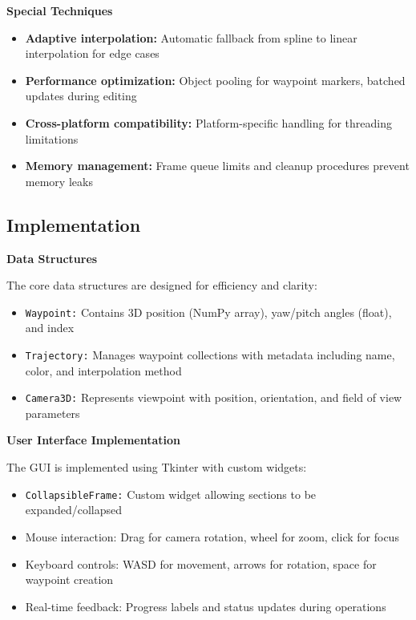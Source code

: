 \documentclass[11pt,a4paper]{article}
\begin{document}
\textbf{Special Techniques}

\begin{itemize}
\item \textbf{Adaptive interpolation:} Automatic fallback from spline to linear interpolation for edge cases
\item \textbf{Performance optimization:} Object pooling for waypoint markers, batched updates during editing
\item \textbf{Cross-platform compatibility:} Platform-specific handling for threading limitations
\item \textbf{Memory management:} Frame queue limits and cleanup procedures prevent memory leaks
\end{itemize}

\subsection{Implementation}

\textbf{Data Structures}

The core data structures are designed for efficiency and clarity:

\begin{itemize}
\item \texttt{Waypoint:} Contains 3D position (NumPy array), yaw/pitch angles (float), and index
\item \texttt{Trajectory:} Manages waypoint collections with metadata including name, color, and interpolation method
\item \texttt{Camera3D:} Represents viewpoint with position, orientation, and field of view parameters
\end{itemize}


\textbf{User Interface Implementation}

The GUI is implemented using Tkinter with custom widgets:
\begin{itemize}
\item \texttt{CollapsibleFrame:} Custom widget allowing sections to be expanded/collapsed
\item Mouse interaction: Drag for camera rotation, wheel for zoom, click for focus
\item Keyboard controls: WASD for movement, arrows for rotation, space for waypoint creation
\item Real-time feedback: Progress labels and status updates during operations
\end{itemize}
\end{document}
